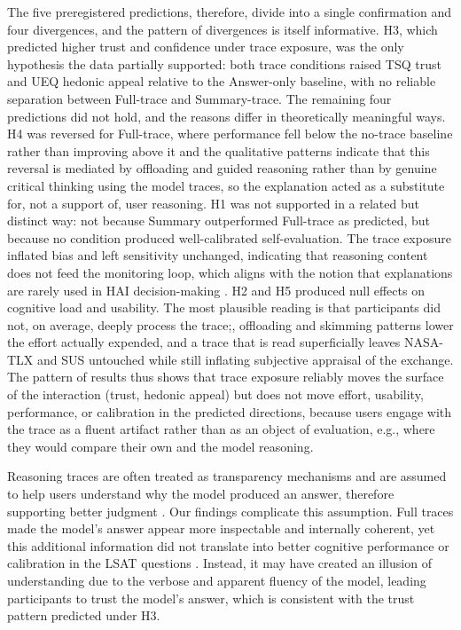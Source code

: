 \documentclass[acmlarge,review=true, anonymous=true]{acmart}
\begin{document}
The five preregistered predictions, therefore, divide into a single confirmation and four divergences, and the pattern of divergences is itself informative. H3, which predicted higher trust and confidence under trace exposure, was the only hypothesis the data partially supported: both trace conditions raised TSQ trust and UEQ hedonic appeal relative to the Answer-only baseline, with no reliable separation between Full-trace and Summary-trace. The remaining four predictions did not hold, and the reasons differ in theoretically meaningful ways. H4 was reversed for Full-trace, where performance fell below the no-trace baseline rather than improving above it and the qualitative patterns indicate that this reversal is mediated by offloading and guided reasoning rather than by genuine critical thinking using the model traces, so the explanation acted as a substitute for, not a support of, user reasoning. H1 was not supported in a related but distinct way: not because Summary outperformed Full-trace as predicted, but because no condition produced well-calibrated self-evaluation. The trace exposure inflated bias and left sensitivity unchanged, indicating that reasoning content does not feed the monitoring loop, which aligns with the notion that explanations are rarely used in HAI decision-making \cite{}. H2 and H5 produced null effects on cognitive load and usability. The most plausible reading is that participants did not, on average, deeply process the trace;, offloading and skimming patterns lower the effort actually expended, and a trace that is read superficially leaves NASA-TLX and SUS untouched while still inflating subjective appraisal of the exchange. The pattern of results thus shows that trace exposure reliably moves the  surface of the interaction (trust, hedonic appeal) but does not move effort, usability, performance, or calibration in the predicted directions, because users engage with the trace as a fluent artifact rather than as an object of evaluation, e.g., where they would compare their own and the model reasoning.

Reasoning traces are often treated as transparency mechanisms and are assumed to help users understand why the model produced an answer, therefore supporting better judgment \cite{}. Our findings complicate this assumption. Full traces made the model's answer appear more inspectable and internally coherent, yet this additional information did not translate into better cognitive performance or calibration in the LSAT questions . Instead, it may have created an illusion of understanding \cite{fisher2021harder} due to the verbose and apparent fluency of the model, leading participants to trust the model's answer, which is consistent with the trust pattern predicted under H3.
\end{document}
